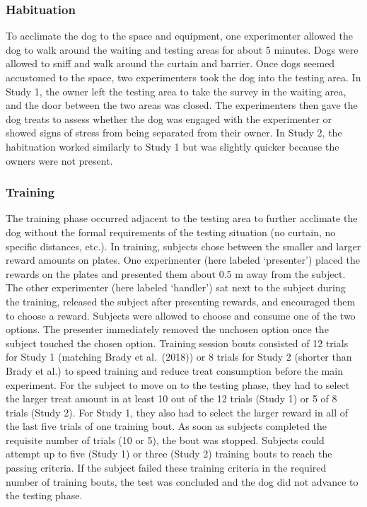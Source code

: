 \documentclass[
  pub,floatsintext]{apa6}
\begin{document}
\hypertarget{habituation}{%
\subsubsection{Habituation}\label{habituation}}

To acclimate the dog to the space and equipment, one experimenter allowed the dog to walk around the waiting and testing areas for about 5 minutes. Dogs were allowed to sniff and walk around the curtain and barrier. Once dogs seemed accustomed to the space, two experimenters took the dog into the testing area. In Study 1, the owner left the testing area to take the survey in the waiting area, and the door between the two areas was closed. The experimenters then gave the dog treats to assess whether the dog was engaged with the experimenter or showed signs of stress from being separated from their owner. In Study 2, the habituation worked similarly to Study 1 but was slightly quicker because the owners were not present.

\hypertarget{training}{%
\subsubsection{Training}\label{training}}

The training phase occurred adjacent to the testing area to further acclimate the dog without the formal requirements of the testing situation (no curtain, no specific distances, etc.). In training, subjects chose between the smaller and larger reward amounts on plates. One experimenter (here labeled `presenter') placed the rewards on the plates and presented them about 0.5 m away from the subject. The other experimenter (here labeled `handler') sat next to the subject during the training, released the subject after presenting rewards, and encouraged them to choose a reward. Subjects were allowed to choose and consume one of the two options. The presenter immediately removed the unchosen option once the subject touched the chosen option. Training session bouts consisted of 12 trials for Study 1 (matching Brady et al.~(2018)) or 8 trials for Study 2 (shorter than Brady et al.) to speed training and reduce treat consumption before the main experiment. For the subject to move on to the testing phase, they had to select the larger treat amount in at least 10 out of the 12 trials (Study 1) or 5 of 8 trials (Study 2). For Study 1, they also had to select the larger reward in all of the last five trials of one training bout. As soon as subjects completed the requisite number of trials (10 or 5), the bout was stopped. Subjects could attempt up to five (Study 1) or three (Study 2) training bouts to reach the passing criteria. If the subject failed these training criteria in the required number of training bouts, the test was concluded and the dog did not advance to the testing phase.
\end{document}
